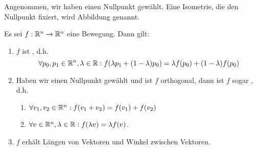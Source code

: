\begin{definition}
Angenommen, wir haben einen Nullpunkt gewählt. Eine Isometrie, die den Nullpunkt fixiert, wird  Abbildung genannt.
\end{definition}

\begin{theorem}
Es sei $f:\mathbb{R}^n\to\mathbb{R}^n$ eine Bewegung. Dann gilt:
\begin{enumerate}
\item $f$ ist , d.h.
\[\forall p_0,p_1\in\mathbb{R}^n, \lambda\in\mathbb{R}: f(\lambda p_1 + (1-\lambda)p_0) = \lambda f(p_0)+(1-\lambda)f(p_0)\]
\item Haben wir einen Nullpunkt gewählt und ist $f$ orthogonal, dann ist $f$ sogar , d.h.
\begin{enumerate}
\item $\forall v_1,v_2\in\mathbb{R}^n: f(v_1+v_2)=f(v_1)+f(v_2)$
\item $\forall v\in\mathbb{R}^n, \lambda\in\mathbb{R}: f(\lambda v)=\lambda f(v)$.
\end{enumerate}
\item $f$ erhält Längen von Vektoren und Winkel zwischen Vektoren.
\end{enumerate}
\end{theorem}
